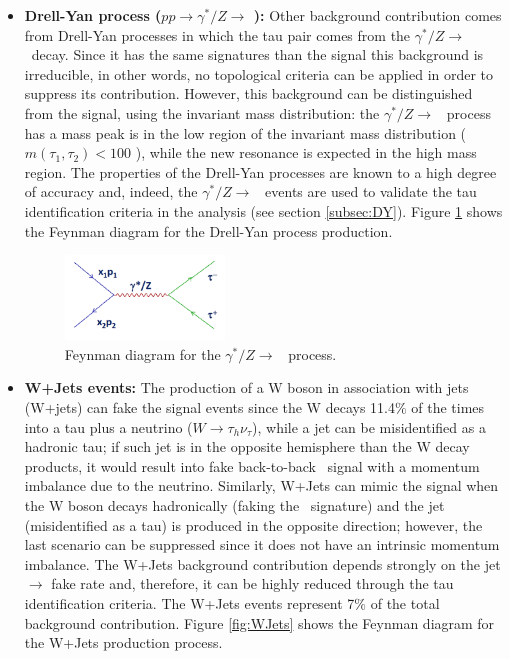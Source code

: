 \begin{itemize}
\item \textbf{Drell-Yan process ($pp \rightarrow \gamma^{*}/Z \rightarrow$ \tauh\tauh):}
Other background contribution comes from Drell-Yan processes in which the 
tau pair comes from the $\gamma^{*}/Z \rightarrow$ \tauh\tauh~decay. Since it has 
the same signatures than the signal this background is irreducible, in other words,
no topological criteria can be applied in order to suppress its contribution. However, this 
background can be distinguished from the signal, using the invariant mass distribution:
the $\gamma^{*}/Z \rightarrow$ \tauh\tauh~process has a mass peak is in the low 
region of the invariant mass distribution ($m(\tau_{1}, \tau_{2}) < 100$ \GeV), while the new resonance 
is expected in the high mass region. The properties of the Drell-Yan processes are
known to a high degree of accuracy and, indeed, the $\gamma^{*}/Z \rightarrow$ \tauh\tauh~events
are used to validate the tau identification criteria in 
the analysis (see section \ref{subsec:DY}). Figure \ref{fig:DY} shows the Feynman 
diagram for the Drell-Yan process production.

\begin{figure}[ht]
 \begin{center} 
 \includegraphics[clip,width=0.4\textwidth]{figuras/Chapter4/Background1}
 \caption{
  Feynman diagram for the $\gamma^{*}/Z \rightarrow$ \tauh\tauh~process.
   }
   \label{fig:DY}
\end{center}
\end{figure}

\item \textbf{W+Jets events:} The production of a W boson in association with 
jets (W+jets) can fake the signal events since the W decays 11.4$\%$
of the times into a tau plus a neutrino ($W\rightarrow \tau_{h} \nu_{\tau}$), 
while a jet can be misidentified as a hadronic tau; if such jet is in the 
opposite hemisphere than the W decay products, it would result into 
fake back-to-back \tauh\tauh~signal with a momentum imbalance due to the neutrino. 
Similarly, W+Jets can mimic the signal when the W boson 
decays hadronically (faking the \tauh~signature) and the jet (misidentified
as a tau) is produced in the opposite direction; however, the last scenario
can be suppressed since it does not have an intrinsic momentum imbalance. 
The W+Jets background contribution depends strongly 
on the jet $\rightarrow$ \tauh fake rate and, therefore, it can be highly reduced 
through the tau identification criteria. The W+Jets events represent 
7$\%$ of the total background contribution. Figure \ref{fig:WJets} shows the Feynman 
diagram for the W+Jets production process.


\end{itemize}
